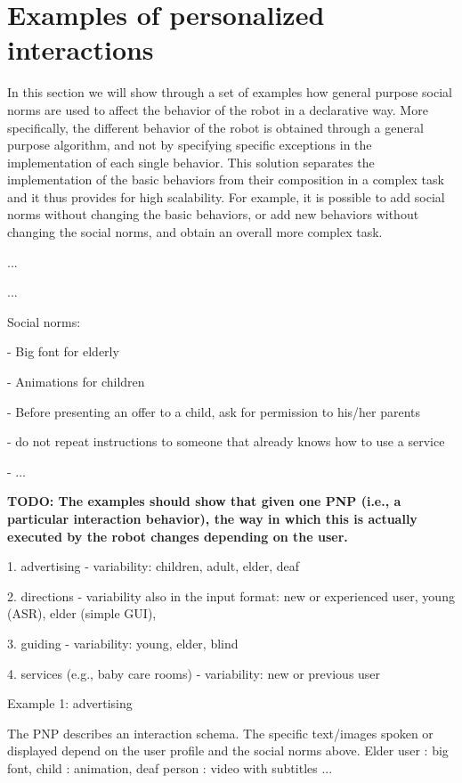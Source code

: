 \section{Examples of personalized interactions}


In this section we will show through a set of examples how general purpose social norms are used to affect the behavior of the robot in a declarative way. More specifically, the different behavior of the robot is obtained through a general purpose algorithm, and not by specifying specific exceptions in the implementation of each single behavior.
This solution separates the implementation of the basic behaviors from their composition in a complex task and it thus provides for high scalability. For example, it is possible to add social norms without changing the basic behaviors, or add new behaviors without changing the social norms, and obtain an overall more complex task.


...





...

Social norms:

- Big font for elderly

- Animations for children 

- Before presenting an offer to a child, ask for permission to his/her parents

- do not repeat instructions to someone that already knows how to use a service

- ...



{\bf TODO: The examples should show that given one PNP (i.e., a particular interaction behavior), the way in which this is actually executed by the robot changes depending on the user.}




1. advertising - variability: children, adult, elder, deaf

2. directions - variability also in the input format: new or experienced user, young (ASR), elder (simple GUI), 

3. guiding - variability: young, elder, blind

4. services (e.g., baby care rooms) - variability: new or previous user


Example 1: advertising

The PNP describes an interaction schema. The specific text/images spoken or displayed depend on the user profile and the social norms above.
Elder user : big font, child : animation, deaf person : video with subtitles ...








